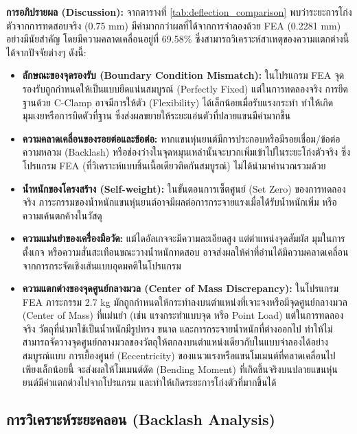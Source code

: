 \textbf{การอภิปรายผล (Discussion):}
จากตารางที่ \ref{tab:deflection_comparison} พบว่าระยะการโก่งตัวจากการทดสอบจริง (0.75 mm) มีค่ามากกว่าผลที่ได้จากการจำลองด้วย FEA (0.2281 mm) อย่างมีนัยสำคัญ โดยมีความคลาดเคลื่อนอยู่ที่ 69.58\% ซึ่งสามารถวิเคราะห์สาเหตุของความแตกต่างนี้ได้จากปัจจัยต่างๆ ดังนี้:
\begin{itemize}
    \item \textbf{ลักษณะของจุดรองรับ (Boundary Condition Mismatch):} ในโปรแกรม FEA จุดรองรับถูกกำหนดให้เป็นแบบยึดแน่นสมบูรณ์ (Perfectly Fixed) แต่ในการทดลองจริง การยึดฐานด้วย C-Clamp อาจมีการให้ตัว (Flexibility) ได้เล็กน้อยเมื่อรับแรงกระทำ ทำให้เกิดมุมเงยหรือการบิดตัวที่ฐาน ซึ่งส่งผลขยายให้ระยะแอ่นตัวที่ปลายแขนมีค่ามากขึ้น
    \item \textbf{ความคลาดเคลื่อนของรอยต่อและข้อต่อ:} หากแขนหุ่นยนต์มีการประกอบหรือมีรอยเชื่อม/ข้อต่อ ความหลวม (Backlash) หรือช่องว่างในจุดหมุนเหล่านั้นจะบวกเพิ่มเข้าไปในระยะโก่งตัวจริง ซึ่งโปรแกรม FEA (ที่วิเคราะห์แบบชิ้นเนื้อเดียวติดกันสมบูรณ์) ไม่ได้นำมาคำนวณรวมด้วย
    \item \textbf{น้ำหนักของโครงสร้าง (Self-weight):} ในขั้นตอนการเซ็ตศูนย์ (Set Zero) ของการทดลองจริง ภาระกรรมของน้ำหนักแขนหุ่นยนต์อาจมีผลต่อการกระจายแรงเมื่อได้รับน้ำหนักเพิ่ม หรือความเค้นตกค้างในวัสดุ
    \item \textbf{ความแม่นยำของเครื่องมือวัด:} แม้ไดอัลเกจจะมีความละเอียดสูง แต่ตำแหน่งจุดสัมผัส มุมในการตั้งเกจ หรือความสั่นสะเทือนขณะวางน้ำหนักทดสอบ อาจส่งผลให้ค่าที่อ่านได้มีความคลาดเคลื่อนจากการกระจัดเชิงเส้นแบบอุดมคติในโปรแกรม
    \item \textbf{ความแตกต่างของจุดศูนย์กลางมวล (Center of Mass Discrepancy):} ในโปรแกรม FEA ภาระกรรม 2.7 kg มักถูกกำหนดให้กระทำลงบนตำแหน่งที่เจาะจงหรือมีจุดศูนย์กลางมวล (Center of Mass) ที่แม่นยำ (เช่น แรงกระทำแบบจุด หรือ Point Load) แต่ในการทดลองจริง วัตถุที่นำมาใช้เป็นน้ำหนักมีรูปทรง ขนาด และการกระจายน้ำหนักที่ต่างออกไป ทำให้ไม่สามารถจัดวางจุดศูนย์กลางมวลของวัตถุให้ตกลงบนตำแหน่งเดียวกับในแบบจำลองได้อย่างสมบูรณ์แบบ การเยื้องศูนย์ (Eccentricity) ของแนวแรงหรือแขนโมเมนต์ที่คลาดเคลื่อนไปเพียงเล็กน้อยนี้ จะส่งผลให้โมเมนต์ดัด (Bending Moment) ที่เกิดขึ้นจริงบนปลายแขนหุ่นยนต์มีค่าแตกต่างไปจากโปรแกรม และทำให้เกิดระยะการโก่งตัวที่มากขึ้นได้
\end{itemize}

\subsection{การวิเคราะห์ระยะคลอน (Backlash Analysis)}
\label{subsec:backlash_analysis}

